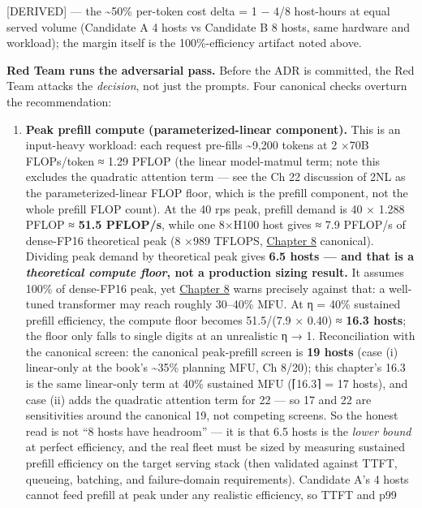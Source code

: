 \mbox{{[}DERIVED{]}} --- the \textasciitilde50\% per-token cost delta = 1 − 4/8
host-hours at equal served volume (Candidate A 4 hosts vs Candidate B 8
hosts, same hardware and workload); the margin itself is the
100\%-efficiency artifact noted above.

\textbf{Red Team runs the adversarial pass.} Before the ADR is
committed, the Red Team attacks the \emph{decision}, not just the
prompts. Four canonical checks overturn the recommendation:

\begin{enumerate}
\def\labelenumi{\arabic{enumi}.}
\tightlist
\item
  \textbf{Peak prefill compute (parameterized-linear component).} This
  is an input-heavy workload: each request pre-fills
  \textasciitilde9,200 tokens at 2 ×70B FLOPs/token ≈ 1.29 PFLOP (the
  linear model-matmul term; note this excludes the quadratic attention
  term --- see the Ch 22 discussion of 2NL as the parameterized-linear
  FLOP floor, which is the prefill component, not the whole prefill FLOP
  count). At the 40 rps peak, prefill demand is 40 × 1.288 PFLOP ≈
  \textbf{51.5 PFLOP/s}, while one 8×H100 host gives ≈ 7.9 PFLOP/s of
  dense-FP16 theoretical peak (8 ×989 TFLOPS, \hyperref[chap:8]{Chapter 8} canonical).
  Dividing peak demand by theoretical peak gives \textbf{6.5 hosts ---
  and that is a \emph{theoretical compute floor}, not a production
  sizing result.} It assumes 100\% of dense-FP16 peak, yet \hyperref[chap:8]{Chapter 8}
  warns precisely against that: a well-tuned transformer may reach
  roughly 30--40\% MFU. At η = 40\% sustained prefill efficiency, the
  compute floor becomes 51.5/(7.9 × 0.40) ≈ \textbf{16.3 hosts}; the
  floor only falls to single digits at an unrealistic η → 1.
  Reconciliation with the canonical screen: the canonical peak-prefill
  screen is \textbf{19 hosts} (case (i) linear-only at the book's
  \textasciitilde35\% planning MFU, Ch 8/20); this chapter's 16.3 is the
  same linear-only term at 40\% sustained MFU (⌈16.3⌉ = 17 hosts), and
  case (ii) adds the quadratic attention term for 22 --- so 17 and 22
  are sensitivities around the canonical 19, not competing screens. So
  the honest read is not ``8 hosts have headroom'' --- it is that 6.5
  hosts is the \emph{lower bound} at perfect efficiency, and the real
  fleet must be sized by measuring sustained prefill efficiency on the
  target serving stack (then validated against TTFT, queueing, batching,
  and failure-domain requirements). Candidate A's 4 hosts cannot feed
  prefill at peak under any realistic efficiency, so TTFT and p99

\end{enumerate}
